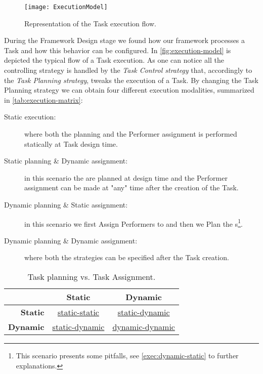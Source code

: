 \begin{figure}[htb]
    \centering
    \texttt{[image: ExecutionModel]}
    \caption{Representation of the Task execution flow.}
    \label{fig:execution-model}
\end{figure}

During the Framework Design stage we found how our framework processes a Task and
how this behavior can be configured. In \autoref{fig:execution-model}
is depicted the typical flow of a Task execution. As one can notice all the
controlling strategy is handled by the \emph{Task Control strategy} that,
accordingly to the \emph{Task Planning strategy}, tweaks the execution of a Task.
By changing the Task Planning strategy we can obtain four different execution
modalities, summarized in \autoref{tab:execution-matrix}:
\begin{description}
    \item[Static execution:] where both the \utask{} planning and the Performer
    assignment is performed statically at Task design time.
    \item[Static \utask{} planning \& Dynamic assignment:] in this scenario the
    \utask{} are planned at design time and the Performer assignment can be made
    at "any" time after the creation of the Task.
    \item[Dynamic \utask{} planning \& Static assignment:] in this scenario we
    first Assign Performers to \utask{} and then we Plan the \utask{}s\footnote{
    This scenario presents some pitfalls, see \ref{exec:dynamic-static} to
    further explanations.}.
    \item[Dynamic \utask{} planning \& Dynamic assignment:] where both the
    strategies can be specified after the Task creation\footnotemark[\value{footnote}].
\end{description}

\begin{table}[htb]
	\caption{Task planning vs. Task Assignment.}
	\label{tab:execution-matrix}
	\centering
	\begin{tabular}{r|c|c}
		 & \textbf{Static} & \textbf{Dynamic}\\
		\hline
		\textbf{Static} & \hyperref[exec:static-static]{static-static} &
        \hyperref[exec:static-dynamic]{static-dynamic}\\
		\hline
		\textbf{Dynamic} & \hyperref[exec:static-dynamic]{static-dynamic} &
        \hyperref[exec:dynamic-dynamic]{dynamic-dynamic}
	\end{tabular}
\end{table}



